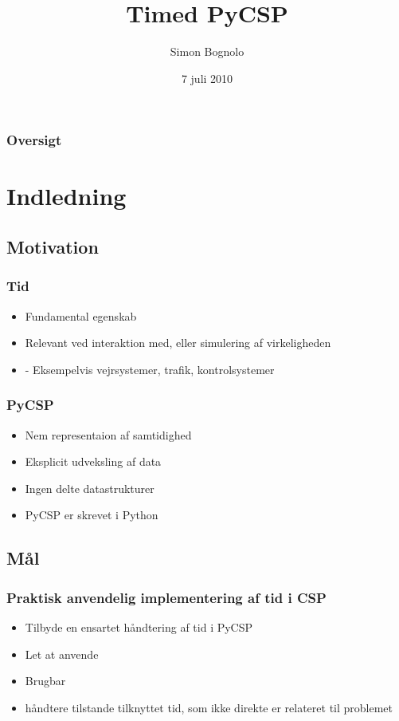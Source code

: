 \documentclass[12pt]{beamer}
\title
{Timed PyCSP}
\institute
{Datalogisk Institut \\ Københavns Universitet}
\author
{Simon Bognolo}
\date
{7 juli 2010}
\begin{document}
\frame[plain]\titlepage

\begin{frame}
  \frametitle{Oversigt}
  \tableofcontents
\end{frame}

\section{Indledning}
\subsection{Motivation}
\begin{frame}
  \frametitle{Tid}
  \begin{itemize}
	\item Fundamental egenskab
	\item Relevant ved interaktion med, eller simulering af virkeligheden
	\item - Eksempelvis vejrsystemer, trafik, kontrolsystemer 
  \end{itemize}
\end{frame}

\begin{frame}
  \frametitle{PyCSP}
  \begin{itemize}
	\item  Nem representaion af samtidighed
	\item Eksplicit udveksling af data
	\item Ingen delte datastrukturer
	\item PyCSP er skrevet i Python
 \end{itemize}
\end{frame}

\subsection{Mål}
\begin{frame}
  \frametitle{Praktisk anvendelig implementering af tid i CSP}
  \begin{itemize}
	\item Tilbyde en ensartet håndtering af tid i PyCSP
	\item Let at anvende
	\item Brugbar
	\item håndtere tilstande tilknyttet tid, som ikke direkte er relateret til problemet
  \end{itemize}
\end{frame}
\end{document}
